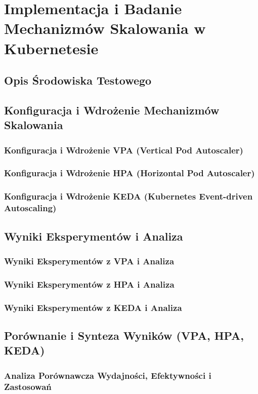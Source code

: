 \newpage

\section{Implementacja i Badanie Mechanizmów Skalowania w Kubernetesie}

\subsection{Opis Środowiska Testowego}

\subsection{Konfiguracja i Wdrożenie Mechanizmów Skalowania}

\subsubsection{Konfiguracja i Wdrożenie VPA (Vertical Pod Autoscaler)}

\subsubsection{Konfiguracja i Wdrożenie HPA (Horizontal Pod Autoscaler)}

\subsubsection{Konfiguracja i Wdrożenie KEDA (Kubernetes Event-driven Autoscaling)}

\subsection{Wyniki Eksperymentów i Analiza}

\subsubsection{Wyniki Eksperymentów z VPA i Analiza}

\subsubsection{Wyniki Eksperymentów z HPA i Analiza}

\subsubsection{Wyniki Eksperymentów z KEDA i Analiza}

\subsection{Porównanie i Synteza Wyników (VPA, HPA, KEDA)}

\subsubsection{Analiza Porównawcza Wydajności, Efektywności i Zastosowań}